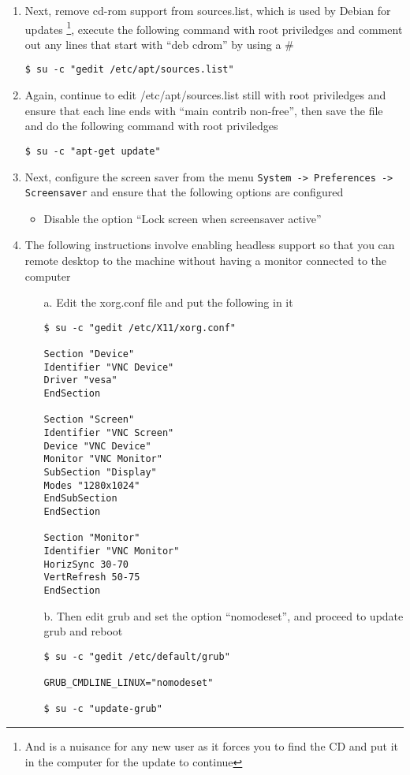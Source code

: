 \begin{enumerate}
\item Next, remove cd-rom support from sources.list, which is used by Debian for updates \footnote{And is a nuisance for any new user
as it forces you to find the CD and put it in the computer for the update to continue}, execute the following command with root priviledges
and comment out any lines that start with ``deb cdrom'' by using a \#
\lstset{caption=Removing CD-ROM Requirement for Updates}
\begin{lstlisting}
$ su -c "gedit /etc/apt/sources.list"
\end{lstlisting}

\item Again, continue to edit /etc/apt/sources.list still with root priviledges and ensure that each line ends with ``main contrib non-free'',
then save the file and do the following command with root priviledges
\lstset{caption=Updating the System}
\begin{lstlisting}
$ su -c "apt-get update"
\end{lstlisting}

\item Next, configure the screen saver from the menu \verb|System -> Preferences -> Screensaver| and ensure that the following options are 
configured
\begin{itemize}
\item	Disable the option ``Lock screen when screensaver active''
\end{itemize}

\item The following instructions involve enabling headless support so that you can remote desktop to the machine without having a monitor
connected to the computer
\begin{itemize}
\item[a.] Edit the xorg.conf file and put the following in it
\lstset{caption=Configuring Xorg for Headless Support}
\begin{lstlisting}
$ su -c "gedit /etc/X11/xorg.conf"

Section "Device"
Identifier "VNC Device"
Driver "vesa"
EndSection

Section "Screen"
Identifier "VNC Screen"
Device "VNC Device"
Monitor "VNC Monitor"
SubSection "Display"
Modes "1280x1024"
EndSubSection
EndSection

Section "Monitor"
Identifier "VNC Monitor"
HorizSync 30-70
VertRefresh 50-75
EndSection

\end{lstlisting}
	
\item[b.] Then edit grub and set the option ``nomodeset'', and proceed to update grub and reboot
\lstset{caption=Configuring Grub for Headless Support}
\begin{lstlisting}
$ su -c "gedit /etc/default/grub"

GRUB_CMDLINE_LINUX="nomodeset"

$ su -c "update-grub"
\end{lstlisting}
\end{itemize}
\end{enumerate}

